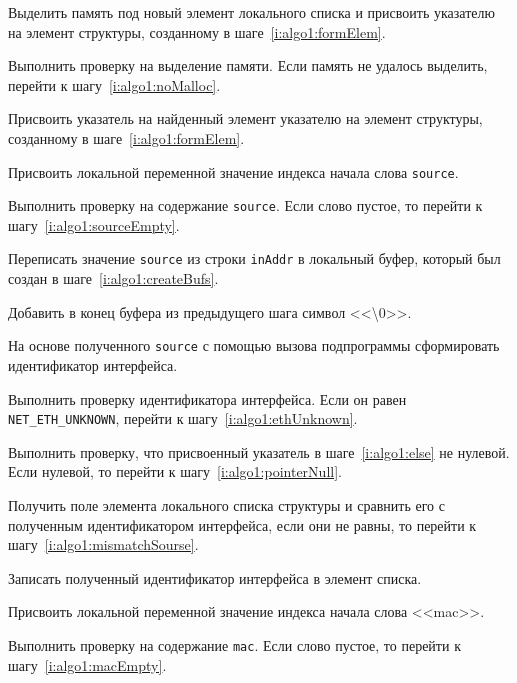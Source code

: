 \begin{enumerate_step}
    \item \label{i:algo1:malloc} Выделить память под новый элемент локального списка и присвоить указателю на элемент структуры, созданному в шаге~\ref{i:algo1:formElem}.
    \item Выполнить проверку на выделение памяти. Если память не удалось выделить, перейти к шагу~\ref{i:algo1:noMalloc}.
    \item \label{i:algo1:else} Присвоить указатель на найденный элемент указателю на элемент структуры, созданному в шаге~\ref{i:algo1:formElem}.

    \item Присвоить локальной переменной значение индекса начала слова \lstinline{source}.
    \item Выполнить проверку на содержание \lstinline{source}. Если слово пустое, то перейти к шагу~\ref{i:algo1:sourceEmpty}.
    \item Переписать значение \lstinline{source} из строки \lstinline{inAddr} в локальный буфер, который был создан в шаге~\ref{i:algo1:createBufs}.
    \item Добавить в конец буфера из предыдущего шага символ <<\textbackslash 0>>.
    \item На основе полученного \lstinline{source} с помощью вызова подпрограммы сформировать идентификатор интерфейса.
    \item Выполнить проверку идентификатора интерфейса. Если он равен \lstinline{NET_ETH_UNKNOWN},
    перейти к шагу~\ref{i:algo1:ethUnknown}.
    \item Выполнить проверку, что присвоенный указатель в шаге~\ref{i:algo1:else} не нулевой. Если нулевой, то перейти к шагу~\ref{i:algo1:pointerNull}.
    \item Получить поле элемента локального списка структуры и сравнить его с полученным идентификатором интерфейса, если они не равны, то перейти к шагу~\ref{i:algo1:mismatchSourse}.
    \item \label{i:algo1:pointerNull} Записать полученный идентификатор интерфейса в элемент списка.

    \item Присвоить локальной переменной значение индекса начала слова <<mac>>.
    \item Выполнить проверку на содержание \lstinline{mac}. Если слово пустое, то перейти к шагу~\ref{i:algo1:macEmpty}.


\end{enumerate_step}

